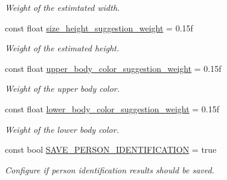 \begin{DoxyCompactItemize}
\begin{DoxyCompactList}\small\item\em Weight of the estimtated width. \end{DoxyCompactList}\item 
\mbox{\label{namespacedto_1_1_configuration_abdb61b602d79713debc1848b1d022518}} 
const float \mbox{\hyperlink{namespacedto_1_1_configuration_abdb61b602d79713debc1848b1d022518}{size\+\_\+height\+\_\+suggestion\+\_\+weight}} = 0.\+15f
\begin{DoxyCompactList}\small\item\em Weight of the estimated height. \end{DoxyCompactList}\item 
\mbox{\label{namespacedto_1_1_configuration_a5bd5e6a24b6eff7842f0000f853b09ad}} 
const float \mbox{\hyperlink{namespacedto_1_1_configuration_a5bd5e6a24b6eff7842f0000f853b09ad}{upper\+\_\+body\+\_\+color\+\_\+suggestion\+\_\+weight}} = 0.\+15f
\begin{DoxyCompactList}\small\item\em Weight of the upper body color. \end{DoxyCompactList}\item 
\mbox{\label{namespacedto_1_1_configuration_ae0868fa0d39d04201ea9d62ed5b6bb34}} 
const float \mbox{\hyperlink{namespacedto_1_1_configuration_ae0868fa0d39d04201ea9d62ed5b6bb34}{lower\+\_\+body\+\_\+color\+\_\+suggestion\+\_\+weight}} = 0.\+15f
\begin{DoxyCompactList}\small\item\em Weight of the lower body color. \end{DoxyCompactList}\item 
\mbox{\label{namespacedto_1_1_configuration_a915efb0be4cc507e0c49e5b689d3f5da}} 
const bool \mbox{\hyperlink{namespacedto_1_1_configuration_a915efb0be4cc507e0c49e5b689d3f5da}{S\+A\+V\+E\+\_\+\+P\+E\+R\+S\+O\+N\+\_\+\+I\+D\+E\+N\+T\+I\+F\+I\+C\+A\+T\+I\+ON}} = true
\begin{DoxyCompactList}\small\item\em Configure if person identification results should be saved. \end{DoxyCompactList}\item 

\end{DoxyCompactItemize}
